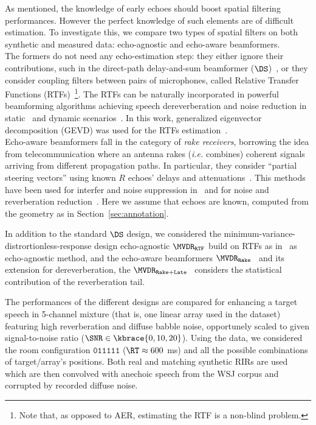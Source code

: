 As mentioned, the knowledge of early echoes should boost spatial filtering performances. However the perfect knowledge of such elements are of difficult estimation. To investigate this, we compare two types of spatial filters on both synthetic and measured data: echo-agnostic and echo-aware beamformers.
\\The formers do not need any echo-estimation step: they either ignore their contributions, such in the direct-path delay-and-sum beamformer ($\DS$)~\cite{VanTrees2004Optimum}, or they consider coupling filters between pairs of microphones, called Relative Transfer Functions (RTFs)~\cite{Gannot2001signal}\footnote{Note that, as opposed to AER, estimating the RTF is a non-blind problem.}.
The RTFs can be naturally incorporated in powerful beamforming algorithms achieving speech dereverberation and noise reduction in static~\cite{Schwartz2014multi}
and dynamic scenarios~\cite{Kodrasi2017evd}.
In this work, generalized eigenvector decomposition (GEVD) was used for the RTFs estimation~\cite{doclo2003robust}.
\\Echo-aware beamformers fall in the category of \textit{rake receivers}, borrowing the idea from telecommunication where an antenna rakes (\textit{i.e.} combines) coherent signals arriving from different propagation paths.
In particular, they consider ``partial steering vectors'' using known $R$ echoes' delays and attenuations~\cite{Jan1995matched}. This methods have been used for interfer and noise suppression in~\cite{Dockmanic2015raking} and for noise and reverberation reduction~\cite{Javed2016spherical, Kowalczyk2019raking}. Here we assume that echoes are known, computed from the geometry as in Section~\ref{sec:annotation}.

In addition to the standard $\DS$ design, we considered the minimum-variance-distrortionless-response design
echo-agnostic $\MVDR_\mathtt{RTF}$ build on RTFs as in~\cite{Schwartz2014multi} as echo-agnostic method, and the echo-aware beamformers $\MVDR_\mathtt{Rake}$~\cite{Dockmanic2015raking} and its extension for dereverberation, the $\MVDR_\mathtt{Rake+Late}$~\cite{Kowalczyk2019raking} considers the statistical contribution of the reverberation tail.

The performances of the different designs are compared for enhancing a target speech in 5-channel mixture (that is, one linear array used in the dataset) featuring high reverberation and diffuse babble noise, opportunely scaled to given signal-to-noise  ratio ($\SNR \in \kbrace{0, 10, 20}$).
Using the \dEchorate{} data, we considered the room configuration $\mathtt{011111}$ ($\RT \approx 600 $ ms) and all the possible combinations of target/array's positions. Both real and matching synthetic RIRs are used which are then convolved with anechoic speech from the WSJ corpus and corrupted by recorded diffuse noise.

